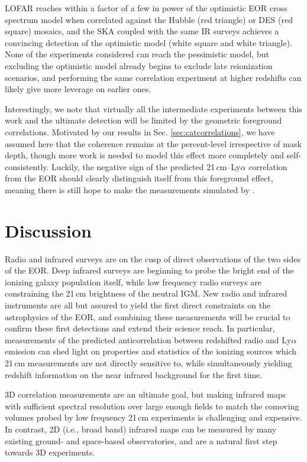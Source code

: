\documentclass[numberedappendix]{emulateapj}
\begin{document}
LOFAR reaches within a factor of a few in power of the optimistic EOR cross spectrum model when correlated against the Hubble (red triangle) or DES (red square) mosaics, and the SKA coupled with the same IR surveys achieves a convincing detection of the optimistic model (white square and white triangle). None of the experiments considered can reach the pessimistic model, but excluding the optimistic model already begins to exclude late reionization scenarios, and performing the same correlation experiment at higher redshifts can likely give more leverage on earlier ones. 

Interestingly, we note that virtually all the intermediate experiments between this work and the ultimate detection will be limited by the geometric foreground correlations. Motivated by our results in Sec. \ref{sec:catcorrelations}, we have assumed here that the coherence remains at the percent-level irrespective of mask depth, though more work is needed to model this effect more completely and self-consistently. Luckily, the negative sign of the predicted 21\,cm--Ly$\alpha$ correlation from the EOR should clearly distinguish itself from this foreground effect, meaning there is still hope to make the measurements simulated by \citet{mao14,StarsAndReionization}.

\section{Discussion}

Radio and infrared surveys are on the cusp of direct observations of the two sides of the EOR. Deep infrared surveys are beginning to probe the bright end of the ionizing galaxy population itself, while low frequency radio surveys are constraining the 21\,cm brightness of the neutral IGM. New radio and infrared instruments are all but assured to yield the first direct constraints on the astrophysics of the EOR, and combining these measurements will be crucial to confirm these first detections and extend their science reach. In particular, measurements of the predicted anticorrelation between redshifted radio and Ly$\alpha$ emission can shed light on properties and statistics of the ionizing sources which 21\,cm measurements are not directly sensitive to, while simultaneously yielding redshift information on the near infrared background for the first time. 

3D correlation measurements are an ultimate goal, but making infrared maps with sufficient spectral resolution over large enough fields to match the comoving volumes probed by low frequency 21\,cm experiments is challenging and expensive. In contrast, 2D (i.e., broad band) infrared maps can be measured by many existing ground- and space-based observatories, and are a natural first step towards 3D experiments. 
\end{document}

